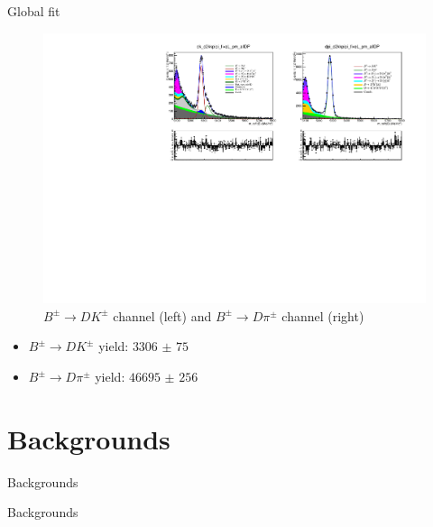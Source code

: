 \documentclass{beamer}
\begin{document}
\begin{frame}{Global fit}
  \begin{figure}
    \centering
    \includegraphics[width = 1.0\textwidth]{Plots/d2kkpipi_fiveL_allDP.pdf}
    \caption{$B^\pm\to DK^\pm$ channel (left) and $B^\pm\to D\pi^\pm$ channel (right)}
  \end{figure}
  \vspace{-0.5cm}
  \begin{itemize}
    \item{$B^\pm\to DK^\pm$ yield: $\SI{3306(75)}{}$}
    \item{$B^\pm\to D\pi^\pm$ yield: $\SI{46695(256)}{}$}
  \end{itemize}
\end{frame}

\section{Backgrounds}
\begin{frame}{Backgrounds}
  \begin{center}
    {\huge Backgrounds}
  \end{center}
\end{frame}
\end{document}
